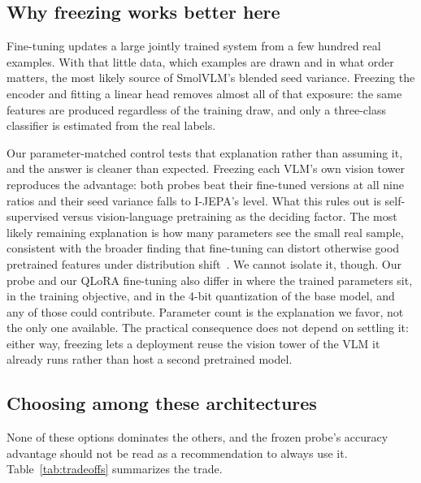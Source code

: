 \documentclass[conference]{IEEEtran}
\begin{document}
\subsection{Why freezing works better here}

Fine-tuning updates a large jointly trained system from a few hundred real examples. With that little data, which examples are drawn and in what order matters, the most likely source of SmolVLM's blended seed variance. Freezing the encoder and fitting a linear head removes almost all of that exposure: the same features are produced regardless of the training draw, and only a three-class classifier is estimated from the real labels.

Our parameter-matched control tests that explanation rather than assuming it, and the answer is cleaner than expected. Freezing each VLM's own vision tower reproduces the advantage: both probes beat their fine-tuned versions at all nine ratios and their seed variance falls to I-JEPA's level. What this rules out is self-supervised versus vision-language pretraining as the deciding factor. The most likely remaining explanation is how many parameters see the small real sample, consistent with the broader finding that fine-tuning can distort otherwise good pretrained features under distribution shift~\cite{kumar2022finetuning}. We cannot isolate it, though. Our probe and our QLoRA fine-tuning also differ in where the trained parameters sit, in the training objective, and in the 4-bit quantization of the base model, and any of those could contribute. Parameter count is the explanation we favor, not the only one available. The practical consequence does not depend on settling it: either way, freezing lets a deployment reuse the vision tower of the VLM it already runs rather than host a second pretrained model.

\subsection{Choosing among these architectures}
\label{sec:discussion-choosing}

None of these options dominates the others, and the frozen probe's accuracy advantage should not be read as a recommendation to always use it. Table~\ref{tab:tradeoffs} summarizes the trade.
\end{document}
